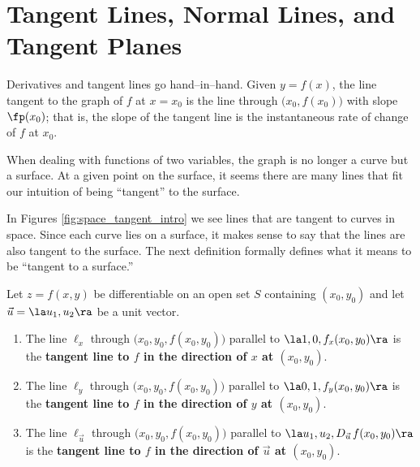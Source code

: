 \section{Tangent Lines, Normal Lines, and Tangent Planes}\label{sec:multi_tangent}

Derivatives and tangent lines go hand--in--hand. Given $y=f(x)$, the line tangent to the graph of $f$ at $x=x_0$ is the line through $\big(x_0,f(x_0)\big) $ with slope $\fp(x_0)$; that is, the slope of the tangent line is the instantaneous rate of change of $f$ at $x_0$. 

When dealing with functions of two variables, the graph is no longer a curve but a surface. At a given point on the surface, it seems there are many lines that fit our intuition of being ``tangent'' to the surface. 


In Figures \ref{fig:space_tangent_intro} we see lines that are tangent to curves in space. Since each curve lies on a  surface, it makes sense to say that the lines are also tangent to the surface. The next definition formally defines what it means to be ``tangent to a surface.'' %

\setboxwidth{10pt}
\noindent\hskip-10pt\begin{minipage}{\specialboxlength}
{Let $z=f(x,y)$ be differentiable on an open set $S$ containing $(x_0,y_0)$ and let $\vec u = \la u_1, u_2\ra$ be a unit vector.
\begin{enumerate}
	\item The line $\ell_x$ through $\big(x_0,y_0,f(x_0,y_0)\big)$ parallel to $\la 1,0,f_x(x_0,y_0)\ra$	is the \textbf{tangent line to $f$ in the direction of $x$ at $(x_0,y_0)$}.
	
	\item The line $\ell_y$  through $\big(x_0,y_0,f(x_0,y_0)\big)$ parallel to $\la 0,1,f_y(x_0,y_0)\ra$	is the \textbf{tangent line to $f$ in the direction of $y$ at $(x_0,y_0)$}.
	
	\item	 The line $\ell_{\vec u}$ through $\big(x_0,y_0,f(x_0,y_0)\big)$ parallel to $\la u_1,u_2,D_{\vec u\,}f(x_0,y_0)\ra$	is the \textbf{tangent line to $f$ in the direction of $\vec u$ at $(x_0,y_0)$}.
	\end{enumerate}
}
\end{minipage}
\restoreboxwidth

